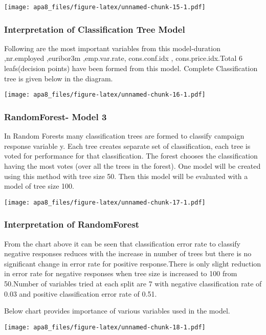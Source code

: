 \documentclass[english,floatsintext,man]{apa6}
\begin{document}
\texttt{[image: apa8\_files/figure-latex/unnamed-chunk-15-1.pdf]}

\subsubsection{Interpretation of Classification Tree
Model}\label{interpretation-of-classification-tree-model}

Following are the most important variables from this model-duration
,nr.employed ,euribor3m ,emp.var.rate, cons.conf.idx ,
cons.price.idx.Total 6 leafs(decision points) have been formed from this
model. Complete Classification tree is given below in the diagram.

\texttt{[image: apa8\_files/figure-latex/unnamed-chunk-16-1.pdf]}

\subsubsection{RandomForest- Model 3}\label{randomforest--model-3}

In Random Forests many classification trees are formed to classify
campaign response variable y. Each tree creates separate set of
classification, each tree is voted for performance for that
classification. The forest chooses the classification having the most
votes (over all the trees in the forest). One model will be created
using this method with tree size 50. Then this model will be evaluated
with a model of tree size 100.

\texttt{[image: apa8\_files/figure-latex/unnamed-chunk-17-1.pdf]}

\subsubsection{Interpretation of
RandomForest}\label{interpretation-of-randomforest}

From the chart above it can be seen that classification error rate to
classify negative responses reduces with the increase in number of trees
but there is no significant change in error rate for positive
response.There is only slight reduction in error rate for negative
responses when tree size is increased to 100 from 50.Number of variables
tried at each split are 7 with negative classification rate of 0.03 and
positive classification error rate of 0.51.

Below chart provides importance of various variables used in the model.

\texttt{[image: apa8\_files/figure-latex/unnamed-chunk-18-1.pdf]}
\end{document}

